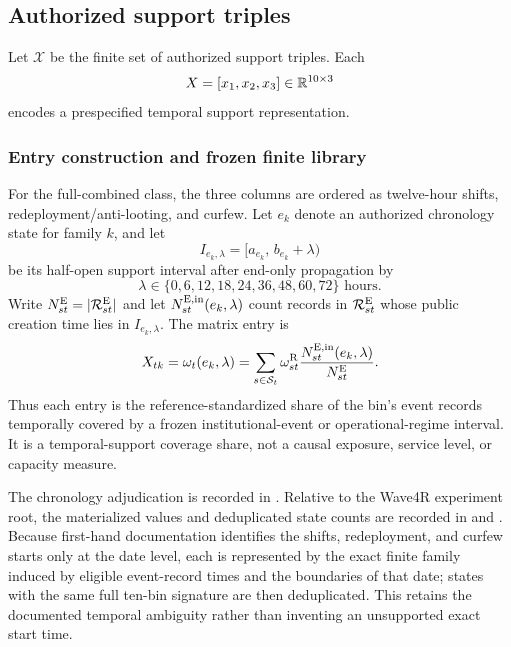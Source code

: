 \documentclass[11pt]{article}
\begin{document}
\subsection{Authorized support triples}

Let $\mathcal X$ be the finite set of authorized support triples. Each
\begin{equation}
X=[x_1,x_2,x_3]\in\mathbb{R}^{10\times3}
\end{equation}
encodes a prespecified temporal support representation.

\subsubsection{Entry construction and frozen finite library}

For the full-combined class, the three columns are ordered as twelve-hour shifts, redeployment/anti-looting, and curfew. Let $e_k$ denote an authorized chronology state for family $k$, and let
\begin{equation}
I_{e_k,\lambda}=[a_{e_k},\,b_{e_k}+\lambda)
\end{equation}
be its half-open support interval after end-only propagation by
\begin{equation}
\lambda\in\{0,6,12,18,24,36,48,60,72\}\text{ hours}.
\end{equation}
Write $N^{\mathrm{E}}_{st}=|\mathcal R^{\mathrm{E}}_{st}|$ and let $N^{\mathrm{E},\mathrm{in}}_{st}(e_k,\lambda)$ count records in $\mathcal R^{\mathrm{E}}_{st}$ whose public creation time lies in $I_{e_k,\lambda}$. The matrix entry is
\begin{equation}
X_{tk}=\omega_t(e_k,\lambda)
=\sum_{s\in\mathcal S_t}\omega^{\mathrm{R}}_{st}
\frac{N^{\mathrm{E},\mathrm{in}}_{st}(e_k,\lambda)}{N^{\mathrm{E}}_{st}}.
\label{eq:support_entry}
\end{equation}
Thus each entry is the reference-standardized share of the bin's event records temporally covered by a frozen institutional-event or operational-regime interval. It is a temporal-support coverage share, not a causal exposure, service level, or capacity measure.

The chronology adjudication is recorded in . Relative to the Wave4R experiment root, the materialized values and deduplicated state counts are recorded in  and . Because first-hand documentation identifies the shifts, redeployment, and curfew starts only at the date level, each is represented by the exact finite family induced by eligible event-record times and the boundaries of that date; states with the same full ten-bin signature are then deduplicated. This retains the documented temporal ambiguity rather than inventing an unsupported exact start time.
\end{document}
